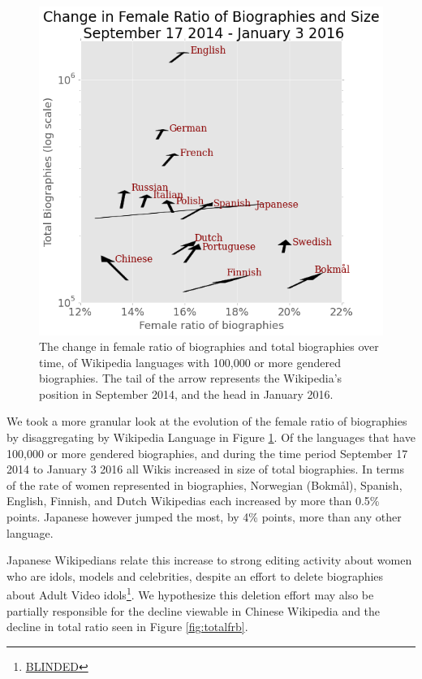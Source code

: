 \documentclass{sig-alternate-05-2015}
\begin{document}
\begin{figure}
\includegraphics[width=\columnwidth]{figures/arrowplot_flippedaxes.png} 
\caption{The change in female ratio of biographies and total biographies over time, of Wikipedia languages with 100,000 or more gendered biographies. The tail of the arrow represents the Wikipedia's position in September 2014, and the head in January 2016.}
\label{fig:changefrb}
\end{figure}

We took a more granular look at the evolution of the female ratio of biographies by disaggregating by Wikipedia Language in Figure \ref{fig:changefrb}. Of the languages that have 100,000 or more gendered biographies, and during the time period September 17 2014 to January 3 2016 all Wikis increased in size of total biographies. In terms of the rate of women represented in biographies, Norwegian (Bokm\aa l), Spanish, English, Finnish, and Dutch Wikipedias each increased by more than 0.5\% points. Japanese however jumped the most, by 4\% points, more than any other language. 

Japanese Wikipedians relate this increase to strong editing activity about women who are idols, models and celebrities, despite an effort to delete biographies about Adult Video idols\footnote{\url{BLINDED}}. We hypothesize this deletion effort may also be partially responsible for the decline viewable in Chinese Wikipedia and the decline in total ratio seen in Figure \ref{fig:totalfrb}.
\end{document}
